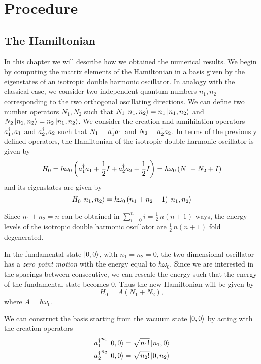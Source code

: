 \documentclass[../thesis.tex]{subfiles}
\begin{document}
\chapter{Procedure}
\label{chap:procedure}

\section{The Hamiltonian}

In this chapter we will describe how we obtained the numerical results.
We begin by computing the matrix elements of the Hamiltonian in a basis
given by the eigenstates of an isotropic double harmonic oscillator.
In analogy with the classical case, we consider two independent
quantum numbers \(n_1, n_2\) corresponding to the two orthogonal
oscillating directions. We can define two number operators \(N_1, N_2\) such that
\(N_1 \ket{n_1, n_2} = n_1 \ket{n_1, n_2}\) and \(N_2 \ket{n_1, n_2} = n_2 \ket{n_1, n_2}\).
We consider the creation and annihilation operators \(a_{1}^{\dagger}, a_1\) and
\(a_{2}^{\dagger}, a_2\)
such that \(  N_1 = a_{1}^{\dagger} a_1 \) and \( N_2 = a_{2}^{\dagger} a_2 \).
In terms of the previously defined operators, the Hamiltonian of the isotropic
double harmonic oscillator is given by
\[
  H_0 = \hbar \omega_0 \left(a_{1}^{\dagger} a_1 + \frac{1}{2} I + a_{2}^{\dagger} a_2 + \frac{1}{2} I\right)
      = \hbar \omega_0 \left(N_1 + N_2 + I\right)
\]
and its eigenstates are given by
\[
  H_0 \ket{n_1, n_2} = \hbar \omega_0 \left( n_1 + n_2 + 1 \right) \ket{n_1, n_2}
\]

Since \(n_1 + n_2 = n\) can be obtained in \(\sum_{i=0}^n i = \frac{1}{2}\,n(n+1)\) ways,
the energy levels of the isotropic double harmonic oscillator are \(\frac{1}{2}\,n(n+1)\) fold
degenerated.

In the fundamental state \(\ket{0, 0}\), with \(n_1=n_2=0\), the two dimensional
oscillator has a \emph{zero point motion} with the energy equal to \(\hbar \omega_0\).
Since we are interested in the spacings between consecutive,
we can rescale the energy such that the energy of the fundamental state becomes \(0\).
Thus the new Hamiltonian will be given by
\[
  H_0 = A \left(N_1 + N_2\right),
\]
where \(A = \hbar \omega_0\).

We can construct the basis starting from the vacuum state \(\ket{0, 0}\) by acting
with the creation operators
\begin{align*}
  {a_{1}^{\dagger}}^{n_1} \ket{0, 0} &= \sqrt{n_1!} \ket{n_1, 0} \\
  {a_{2}^{\dagger}}^{n_2} \ket{0, 0} &= \sqrt{n_2!} \ket{0, n_2}
\end{align*}
\end{document}
